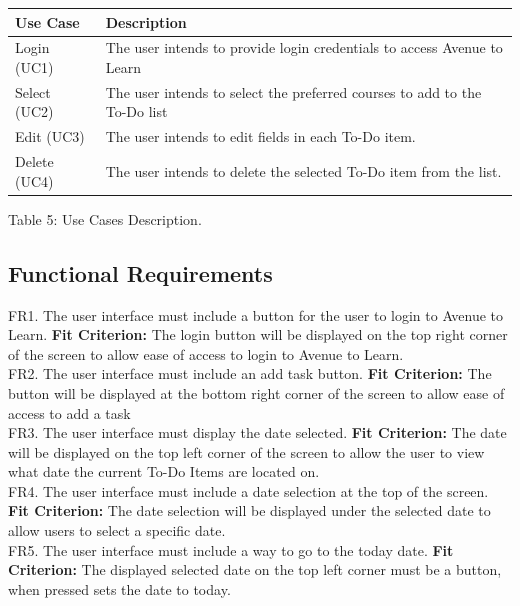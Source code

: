 \documentclass[12pt, titlepage]{article}
\begin{document}
\begin{center}
\begin{tabular}{ |m{4em}|m{26em}| } 
 \hline
 Use Case & Description \\ 
 \hline
 Login (UC1) & The user intends to provide login credentials to access Avenue to Learn \\
 \hline
 Select (UC2) & The user intends to select the preferred courses to add to the To-Do list \\ 
 \hline
 Edit (UC3) & The user intends to edit fields in each To-Do item.\\
 \hline 
 Delete (UC4) & The user intends to delete the selected To-Do item from the list.\\
 \hline
\end{tabular}
Table 5: Use Cases Description.
\end{center}

\subsection{Functional Requirements}

FR1. The user interface must include a button for the user to login to Avenue to Learn.
	\textbf{Fit Criterion:} The login button will be displayed on the top right corner of the screen to 
	allow ease of access to login to Avenue to Learn.\\

\noindent FR2. The user interface must include an add task button.
	\textbf{Fit Criterion:} The button will be displayed at the bottom right corner of the screen to 
allow ease of access to add a task\\

\noindent FR3. The user interface must display the date selected.
	\textbf{Fit Criterion:} The date will be displayed on the top left corner of the screen to allow the 
user to view what date the current To-Do Items are located on.\\

\noindent FR4. The user interface must include a date selection at the top of the screen.
	\textbf{Fit Criterion:} The date selection will be displayed under the selected date to allow users 
to select a specific date.\\

\noindent FR5. The user interface must include a way to go to the today date.
	\textbf{Fit Criterion:} The displayed selected date on the top left corner must be a button, when 
pressed sets the date to today.\\
\end{document}
